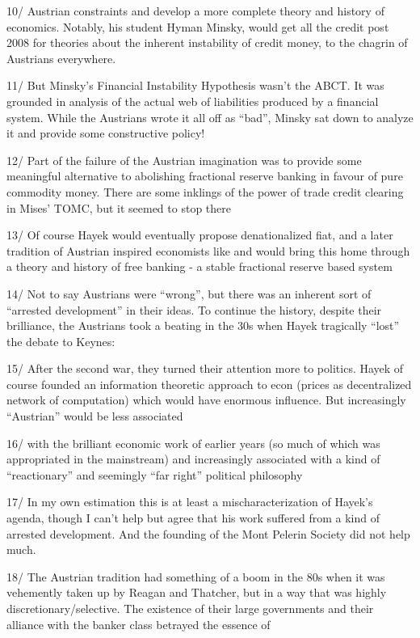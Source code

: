 \documentclass[
]{book}
\begin{document}
10/ Austrian constraints and develop a more complete theory and history of economics. Notably, his student Hyman Minsky, would get all the credit post 2008 for theories about the inherent instability of credit money, to the chagrin of Austrians everywhere.

11/ But Minsky's Financial Instability Hypothesis wasn't the ABCT. It was grounded in analysis of the actual web of liabilities produced by a financial system. While the Austrians wrote it all off as ``bad'', Minsky sat down to analyze it and provide some constructive policy!

12/ Part of the failure of the Austrian imagination was to provide some meaningful alternative to abolishing fractional reserve banking in favour of pure commodity money. There are some inklings of the power of trade credit clearing in Mises' TOMC, but it seemed to stop there

13/ Of course Hayek would eventually propose denationalized fiat, and a later tradition of Austrian inspired economists like \citet{GeorgeSelgin} and \citet{lawrencehwhite1} would bring this home through a theory and history of free banking - a stable fractional reserve based system

14/ Not to say Austrians were ``wrong'', but there was an inherent sort of ``arrested development'' in their ideas. To continue the history, despite their brilliance, the Austrians took a beating in the 30s when Hayek tragically ``lost'' the debate to Keynes:

15/ After the second war, they turned their attention more to politics. Hayek of course founded an information theoretic approach to econ (prices as decentralized network of computation) which would have enormous influence. But increasingly ``Austrian'' would be less associated

16/ with the brilliant economic work of earlier years (so much of which was appropriated in the mainstream) and increasingly associated with a kind of ``reactionary'' and seemingly ``far right'' political philosophy

17/ In my own estimation this is at least a mischaracterization of Hayek's agenda, though I can't help but agree that his work suffered from a kind of arrested development. And the founding of the Mont Pelerin Society did not help much.

18/ The Austrian tradition had something of a boom in the 80s when it was vehemently taken up by Reagan and Thatcher, but in a way that was highly discretionary/selective. The existence of their large governments and their alliance with the banker class betrayed the essence of
\end{document}
